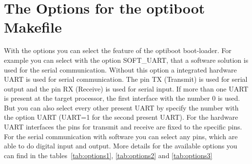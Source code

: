 \section{The Options for the optiboot Makefile}

With the options you can select the feature of the optiboot boot-loader.
For example you can select with the option SOFT\_UART, that a software solution
is used for the serial communication.
Without this option a integrated hardware UART is used for serial communication.
The pin TX (Transmit) is used for serial output and the pin RX (Receive) is used
for serial input. If more than one UART is present at the target processor,
the first interface with the number 0 is used.
But you can also select every other present UART by specify the number with
the option UART (UART=1 for the second present UART).
For the hardware UART interfaces the pins for transmit and receive are fixed
to the specific pins. For the serial communication with software you can
select any pins, which are able to do digital input and output.
More details for the available options you can find in the tables~\ref{tab:options1},
\ref{tab:options2} and \ref{tab:options3}

